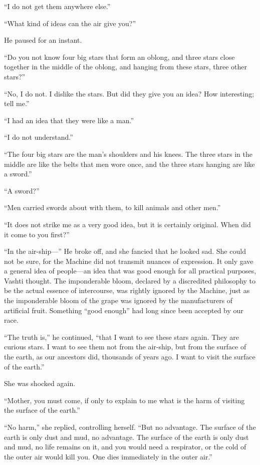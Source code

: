 ``I do not get them anywhere else.''

``What kind of ideas can the air give you?''

He paused for an instant.

``Do you not know four big stars that form an oblong, and three stars close together in the middle of the oblong, and hanging from these stars, three other stars?''

``No, I do not. I dislike the stars. But did they give you an idea? How interesting; tell me.''

``I had an idea that they were like a man.''

``I do not understand.''

``The four big stars are the man's shoulders and his knees. The three stars in the middle are like the belts that men wore once, and the three stars hanging are like a sword.''

``A sword?'' %

``Men carried swords about with them, to kill animals and other men.''

``It does not strike me as a very good idea, but it is certainly original. When did it come to you first?''

``In the air-ship---'' He broke off, and she fancied that he looked sad. She could not be sure, for the Machine did not transmit nuances of expression. It only gave a general idea of people---an idea that was good enough for all practical purposes, Vashti thought. The imponderable bloom, declared by a discredited philosophy to be the actual essence of intercourse, was rightly ignored by the Machine, just as the imponderable bloom of the grape was ignored by the manufacturers of artificial fruit. Something ``good enough'' had long since been accepted by our race.

``The truth is,'' he continued, ``that I want to see these stars again. They are curious stars. I want to see them not from the air-ship, but from the surface of the earth, as our ancestors did, thousands of years ago. I want to visit the surface of the earth.''

She was shocked again.

``Mother, you must come, if only to explain to me what is the harm of visiting the surface of the earth.''

``No harm,'' she replied, controlling herself. ``But no advantage. The surface of the earth is only dust and mud, no advantage. The surface of the earth is only dust and mud, no life remains on it, and you would need a respirator, or the cold of the outer air would kill you. One dies immediately in the outer air.''

